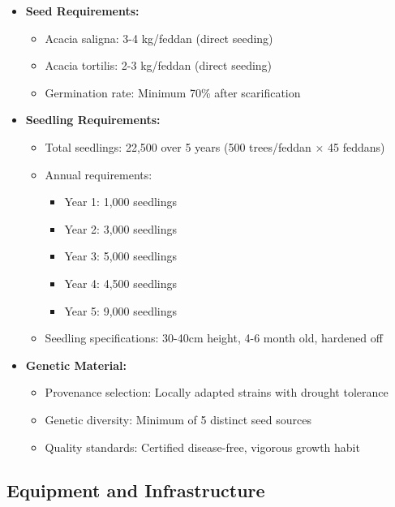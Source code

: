 \begin{itemize}
    \item \textbf{Seed Requirements:}
    \begin{itemize}
        \item Acacia saligna: 3-4 kg/feddan (direct seeding)
        \item Acacia tortilis: 2-3 kg/feddan (direct seeding)
        \item Germination rate: Minimum 70\% after scarification
    \end{itemize}
    \item \textbf{Seedling Requirements:}
    \begin{itemize}
        \item Total seedlings: 22,500 over 5 years (500 trees/feddan × 45 feddans)
        \item Annual requirements:
        \begin{itemize}
            \item Year 1: 1,000 seedlings
            \item Year 2: 3,000 seedlings
            \item Year 3: 5,000 seedlings
            \item Year 4: 4,500 seedlings
            \item Year 5: 9,000 seedlings
        \end{itemize}
        \item Seedling specifications: 30-40cm height, 4-6 month old, hardened off
    \end{itemize}
    \item \textbf{Genetic Material:}
    \begin{itemize}
        \item Provenance selection: Locally adapted strains with drought tolerance
        \item Genetic diversity: Minimum of 5 distinct seed sources
        \item Quality standards: Certified disease-free, vigorous growth habit
    \end{itemize}
\end{itemize}

\subsection{Equipment and Infrastructure}

